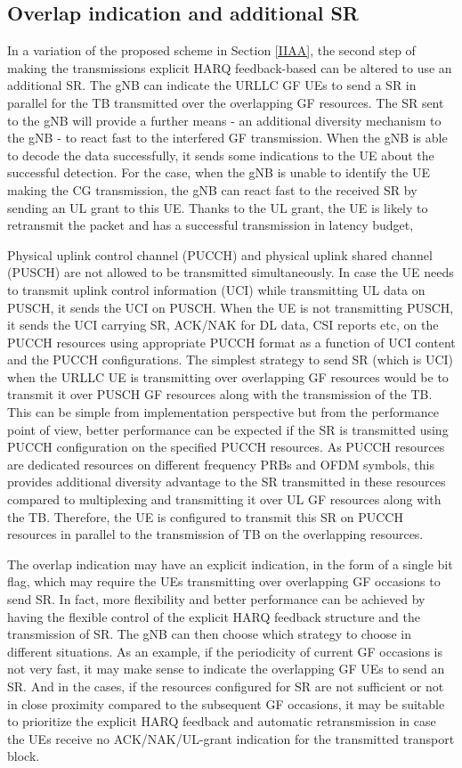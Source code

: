 \documentclass[conference]{IEEEtran}
\begin{document}
\subsection{Overlap indication and additional SR}\label{IIBB}
In a variation of the proposed scheme in Section \ref{IIAA}, the second step of making the transmissions explicit HARQ feedback-based can be altered to use an additional SR. The gNB can indicate the URLLC GF UEs to send a SR in parallel for the TB transmitted over the overlapping GF resources. The SR sent to the gNB will provide a further means - an additional diversity mechanism to the gNB - to react fast to the interfered GF transmission. When the gNB is able to decode the data successfully, it sends some indications to the UE about the successful detection. For the case, when the gNB is unable to identify the UE making the CG transmission, the gNB can react fast to the received SR by sending an UL grant to this UE. Thanks to the UL grant, the UE is likely to retransmit the packet and has a successful transmission in latency budget,

Physical uplink control channel (PUCCH) and physical uplink shared channel (PUSCH) are not allowed to be transmitted simultaneously. In case the UE needs to transmit uplink control information (UCI) while transmitting UL data on PUSCH, it sends the UCI on PUSCH. When the UE is not transmitting PUSCH, it sends the UCI carrying SR, ACK/NAK for DL data, CSI reports etc, on the PUCCH resources using appropriate PUCCH format as a function of UCI content and the PUCCH configurations. The simplest strategy to send SR (which is UCI) when the URLLC UE is transmitting over overlapping GF resources would be to transmit it over PUSCH GF resources along with the transmission of the TB. This can be simple from implementation perspective but from the performance point of view, better performance can be expected if the SR is transmitted using PUCCH configuration on the specified PUCCH resources. As PUCCH resources are dedicated resources on different frequency PRBs and OFDM symbols, this provides additional diversity advantage to the SR transmitted in these resources compared to multiplexing and transmitting it over UL GF resources along with the TB. Therefore, the UE is configured to transmit this SR on PUCCH resources in parallel to the transmission of TB on the overlapping resources.

The overlap indication may have an explicit indication, in the form of a single bit flag, which may require the UEs transmitting over overlapping GF occasions to send SR. In fact, more flexibility and better performance can be achieved by having the flexible control of the explicit HARQ feedback structure and the transmission of SR. The gNB can then choose which strategy to choose in different situations. As an example, if the periodicity of current GF occasions is not very fast, it may make sense to indicate the overlapping GF UEs to send an SR. And in the cases, if the resources configured for SR are not sufficient or not in close proximity compared to the subsequent GF occasions, it may be suitable to prioritize the explicit HARQ feedback and automatic retransmission in case the UEs receive no ACK/NAK/UL-grant indication for the transmitted transport block.
\end{document}
